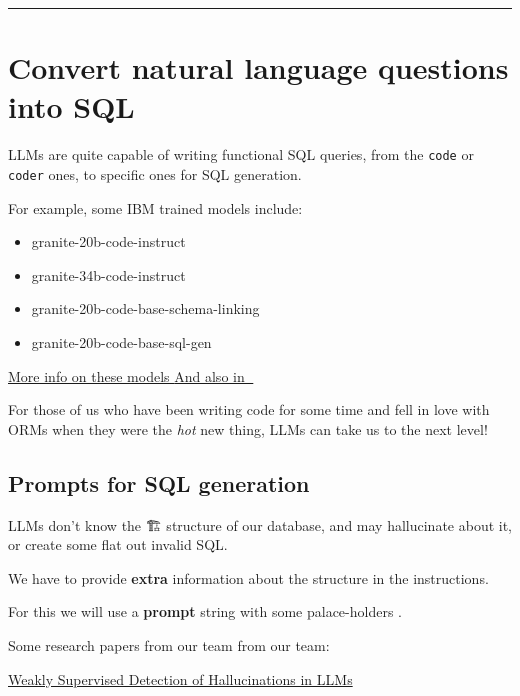 \documentclass[
  letterpaper,
  DIV=11,
  numbers=noendperiod]{scrartcl}
\providecommand{\tightlist}{%
  \setlength{\itemsep}{0pt}\setlength{\parskip}{0pt}}
\begin{document}
\begin{center}\rule{0.5\linewidth}{0.5pt}\end{center}

\section{Convert natural language questions into
SQL}\label{convert-natural-language-questions-into-sql}

LLMs are quite capable of writing functional SQL queries, from the
\texttt{code} or \texttt{coder} ones, to specific ones for SQL
generation.

For example, some IBM trained models include:

\begin{itemize}
\tightlist
\item
  granite-20b-code-instruct
\item
  granite-34b-code-instruct
\item
  granite-20b-code-base-schema-linking
\item
  granite-20b-code-base-sql-gen
\end{itemize}

\href{https://dataplatform.cloud.ibm.com/docs/content/wsj/analyze-data/fm-models-ibm.html?context=wx&locale=en&audience=wdp\#granite-code-instruct-models}{More
info on these models }
\href{https://huggingface.co/models?search=sql}{And also in 🤗 }

For those of us who have been writing code for some time and fell in
love with ORMs when they were the \emph{hot} new thing, LLMs can take us
to the next level!

\subsection{Prompts for SQL
generation}\label{prompts-for-sql-generation}

LLMs don't know the 🏗️ structure of our database, and may hallucinate
about it, or create some flat out invalid SQL.

We have to provide \textbf{extra} information about the structure in the
instructions.

For this we will use a \textbf{prompt} string with some palace-holders .

Some research papers from our team from our team:

\href{https://arxiv.org/pdf/2312.02798}{ Weakly Supervised Detection of
Hallucinations in LLMs}
\end{document}
